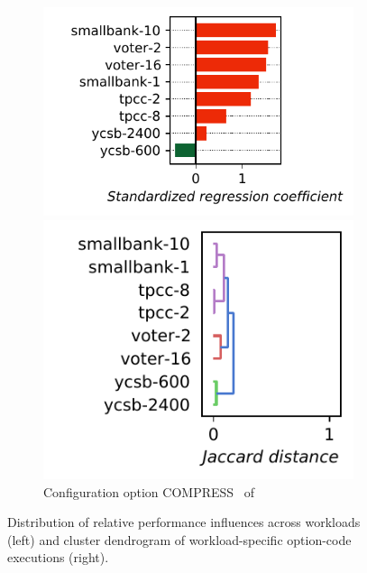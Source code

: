 \begin{figure}
	\begin{subfigure}{0.99\linewidth}
		\begin{minipage}{0.5\linewidth}
			\includegraphics[width=\linewidth]{images/plots/h2_MVSTORE_influences.pdf}
		\end{minipage}
		\begin{minipage}{0.5\linewidth}
			\includegraphics[width=0.8\linewidth]{images/plots/h2_MVSTORE_workloads.pdf}
		\end{minipage}
		\caption{Configuration option \guillemotleft\textsf{COMPRESS}\guillemotright~ of \htwo}
		\label{fig:results_rq3_h2}
	\end{subfigure}
	\caption{Distribution of relative performance influences across workloads (left) and cluster dendrogram of workload-specific option-code executions (right).}
	\label{fig:results_rq3}
\end{figure}

